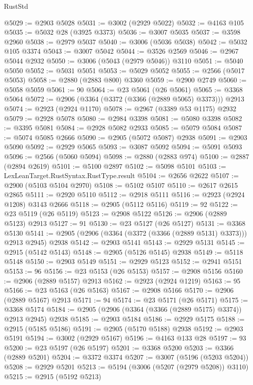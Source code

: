 \begin{lexlean}{RustStd}
\begin{coremodule}
{\begin{coremodule}
{{{{{{{{{{{{{{{{{{{{{{{{{{{{{{{{{{{{{{{{{{{{{{{{{{{{{{{{{{{{{{{{{{{{{{{{{{{{{{@5029 := @2903 @5028
@5031 := @3002 (@2929 @5022)
@5032 := @4163 @105
@5035 := @5032 @28 (@3925 @3373)
@5036 := @3007 @5035
@5037 := @3598 @2960
@5038 := @2979 @5037
@5040 := @3006 (@5036 @5038)
@5042 := @5032 @105 @3374
@5043 := @3007 @5042
@5044 := @3526 @2569
@5046 := @2967 @5044 @2932
@5050 := @3006 (@5043 (@2979 @5046)) @3110
@5051 := @5040 @5050
@5052 := @5031 @5051
@5053 := @5029 @5052
@5055 := @2566 (@5017 @5053)
@5058 := @2880 (@2883 @800) @3360
@5059 := @2900 @2749
@5060 := @5058 @5059
@5061 := 90
@5064 := @23 @5061 (@26 @5061)
@5065 := @3368 @5064
@5072 := @2906 (@3364 (@3372 (@3366 (@2889 @5065) @3373))) @2913
@5074 := @2923 (@2924 @1170)
@5078 := @2967 (@3389 @53 @1175) @2932
@5079 := @2928 @5078
@5080 := @2984 @3398
@5081 := @5080 @3398
@5082 := @3395 @5081
@5084 := @2928 @5082 @2933
@5085 := @5079 @5084
@5087 := @5074 @5085 @2666
@5090 := @2905 (@5072 @5087) @2938
@5091 := @2903 @5090
@5092 := @2929 @5065
@5093 := @3087 @5092
@5094 := @5091 @5093
@5096 := @2566 (@5060 @5094)
@5098 := @2880 (@2883 @974)
@5100 := @2887 (@2894 @2619)
@5101 := @5100 @2897
@5102 := @5098 @5101
@5103 := LexLeanTarget.RustSyntax.RustType.result
@5104 := @2656 @2622
@5107 := @2900 (@5103 @5104 @2970)
@5108 := @5102 @5107
@5110 := @2617 @2615 @2865
@5111 := @2920 @5110
@5112 := @2918 @5111
@5116 := @2923 (@2924 @1208) @3143 @2666
@5118 := @2905 (@5112 @5116)
@5119 := 92
@5122 := @23 @5119 (@26 @5119)
@5123 := @2908 @5122
@5126 := @2906 (@2889 @5123) @2913
@5127 := 91
@5130 := @23 @5127 (@26 @5127)
@5131 := @3368 @5130
@5141 := @2905 (@2906 (@3364 (@3372 (@3366 (@2889 @5131) @3373))) @2913 @2945) @2938
@5142 := @2903 @5141
@5143 := @2929 @5131
@5145 := @2915 (@5142 @5143)
@5148 := @2905 (@5126 @5145) @2938
@5149 := @5118 @5148
@5150 := @2903 @5149
@5151 := @2929 @5123
@5152 := @2941 @5151
@5153 := 96
@5156 := @23 @5153 (@26 @5153)
@5157 := @2908 @5156
@5160 := @2906 (@2889 @5157) @2913
@5162 := @2923 (@2924 @1219)
@5163 := 95
@5166 := @23 @5163 (@26 @5163)
@5167 := @2908 @5166
@5170 := @2906 (@2889 @5167) @2913
@5171 := 94
@5174 := @23 @5171 (@26 @5171)
@5175 := @3368 @5174
@5184 := @2905 (@2906 (@3364 (@3366 (@2889 @5175) @3374)) @2913 @2945) @2938
@5185 := @2903 @5184
@5186 := @2929 @5175
@5188 := @2915 (@5185 @5186)
@5191 := @2905 (@5170 @5188) @2938
@5192 := @2903 @5191
@5194 := @3002 (@2929 @5167)
@5196 := @4163 @133 @28
@5197 := 93
@5200 := @23 @5197 (@26 @5197)
@5201 := @3368 @5200
@5203 := @3366 (@2889 @5201)
@5204 := @3372 @3374
@5207 := @3007 (@5196 (@5203 @5204))
@5208 := @2929 @5201
@5213 := @5194 (@3006 (@5207 (@2979 @5208)) @3110)
@5215 := @2915 (@5192 @5213)
}}}}}}}}}}}}}}}}}}}}}}}}}}}}}}}}}}}}}}}}}}}}}}}}}}}}}}}}}}}}}}}}}}}}}}}}}}}}}}
\end{coremodule}}
\end{coremodule}
\end{lexlean}
